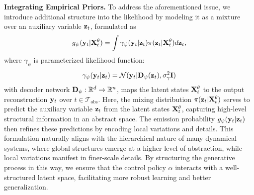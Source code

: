 \textbf{Integrating Empirical Priors. }
To address the aforementioned issue, we introduce additional structure into the likelihood by modeling it as a mixture over an auxiliary variable $\mathbf{z}_t$, formulated as
\[
    g_{\psi}(\mathbf{y}_t|\mathbf{X}^{\theta}_t) = \int \gamma_{\psi}(\mathbf{y}_t | \mathbf{z}_t) \pi(\mathbf{z}_t | \mathbf{X}^{\theta}_t) d\mathbf{z}_t,
\]
where $\gamma_{\psi}$ is parameterized likelihood function:
\[
\gamma_{\psi}(\mathbf{y}_t|\mathbf{z}_t) = \mathcal{N}(\mathbf{y}_t | \mathbf{D}_{\psi}(\mathbf{z}_t), \sigma^2_\gamma \mathbf{I})
\] with decoder network $\mathbf{D}_{\psi} : \mathbb{R}^d \to \mathbb{R}^n$, maps the latent states $\mathbf{X}^{\theta}_t$ to the output reconstruction $\mathbf{y}_t$ over $t \in \mathcal{T}_{\text{obs}}$.
Here, the mixing distribution $\pi(\mathbf{z}_t | \mathbf{X}^{\theta}_t)$ serves to predict the auxiliary variable $\mathbf{z}_t$ from the latent states $\mathbf{X}_t^\theta$, capturing high-level structural information in an abstract space. The emission probability $g_\psi(\mathbf{y}_t | \mathbf{z}_t)$ then refines these predictions by encoding local variations and details.
This formulation naturally aligns with the hierarchical nature of many dynamical systems, where global structures emerge at a higher level of abstraction, while local variations manifest in finer-scale details. By structuring the generative process in this way, we ensure that the control policy $\alpha$ interacts with a well-structured latent space, facilitating more robust learning and better generalization.







